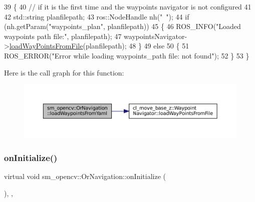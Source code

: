 \begin{DoxyCode}
39         \{
40             \textcolor{comment}{// if it is the first time and the waypoints navigator is not configured}
41 
42             std::string planfilepath;
43             ros::NodeHandle nh(\textcolor{stringliteral}{"~"});
44             \textcolor{keywordflow}{if} (nh.getParam(\textcolor{stringliteral}{"waypoints\_plan"}, planfilepath))
45             \{
46                 ROS\_INFO(\textcolor{stringliteral}{"Loaded waypoints path file:"}, planfilepath);
47                 waypointsNavigator->\hyperlink{classcl__move__base__z_1_1WaypointNavigator_a18d74467ddf0e637a8d5a6e1fa2e93db}{loadWayPointsFromFile}(planfilepath);
48             \}
49             \textcolor{keywordflow}{else}
50             \{
51                 ROS\_ERROR(\textcolor{stringliteral}{"Error while loading waypoints\_path file: not found"});
52             \}
53         \}
\end{DoxyCode}
Here is the call graph for this function\+:
\nopagebreak
\begin{figure}[H]
\begin{center}
\leavevmode
\includegraphics[width=350pt]{classsm__opencv_1_1OrNavigation_aa99364dd28b18be701d85187f9896999_cgraph}
\end{center}
\end{figure}
\mbox{\label{classsm__opencv_1_1OrNavigation_a62f5ac68bfa502e92cf1fe1e3ca31781}} 
\subsubsection{\texorpdfstring{on\+Initialize()}{onInitialize()}}
{\footnotesize\ttfamily virtual void sm\+\_\+opencv\+::\+Or\+Navigation\+::on\+Initialize (\begin{DoxyParamCaption}{ }\end{DoxyParamCaption})\hspace{0.3cm}{\ttfamily [inline]}, {\ttfamily [override]}, {\ttfamily [virtual]}}



